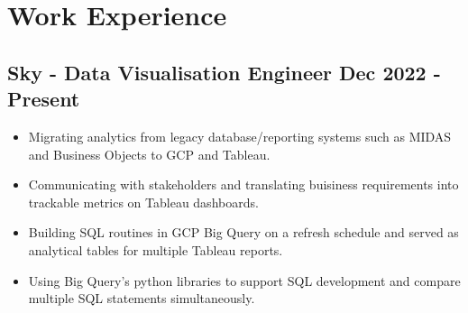 \documentclass[a4paper,9pt]{article}
\begin{document}
\section*{Work Experience}
\subsection*{\textbf{Sky - Data Visualisation Engineer} \hfill  Dec 2022 - Present}
\begin{itemize}[noitemsep]

    \item Migrating analytics from legacy database/reporting systems such as MIDAS and Business Objects to GCP and Tableau.
    \item Communicating with stakeholders and translating buisiness requirements into trackable metrics on Tableau dashboards.
    \item Building SQL routines in GCP Big Query on a refresh schedule and served as analytical tables for multiple Tableau reports.
     \item Using Big Query's python libraries to support SQL development and compare multiple SQL statements simultaneously.

\end{itemize}
\end{document}
